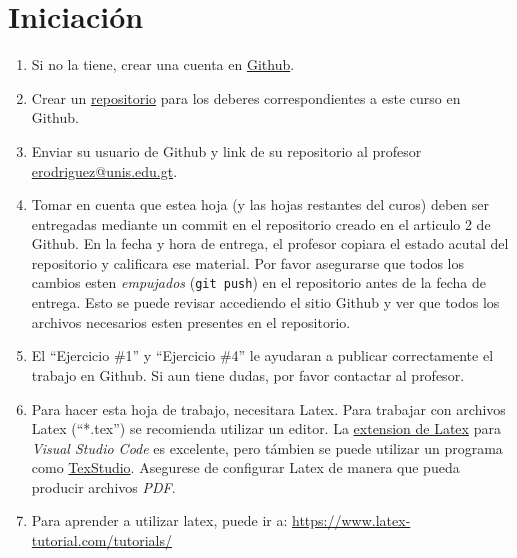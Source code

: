 \documentclass{article}
\begin{document}
\section*{Iniciaci\'on}
\begin{enumerate}
        \item{Si no la tiene, crear una cuenta en \href{https://github.com/}{Github}.}
        \item{Crear un \href{https://help.github.com/en/articles/create-a-repo}{repositorio} para los deberes correspondientes a este curso en Github.}
        \item{Enviar su usuario de Github y link de su repositorio al profesor
        \href{mailto:erodriguez@unis.edu.gt}{erodriguez@unis.edu.gt}.}
        \item{Tomar en cuenta que estea hoja
        (y las hojas restantes del curos) deben ser entregadas mediante un commit
        en el repositorio creado en el articulo 2 de Github. En la fecha y hora de entrega,
        el profesor copiara el estado acutal del repositorio y calificara ese material. Por
        favor asegurarse que todos los cambios esten \emph{empujados} (\texttt{git push}) en el
        repositorio antes de la fecha de entrega. Esto se puede revisar accediendo el sitio
        Github y ver que todos los archivos necesarios esten presentes en el repositorio.}
        \item{El ``Ejercicio \#1'' y ``Ejercicio \#4'' le ayudaran a publicar correctamente
        el trabajo en Github. Si aun tiene dudas, por favor contactar al profesor.}
        \item{Para hacer esta hoja de trabajo, necesitara Latex. Para trabajar
        con archivos Latex (``*.tex'') se recomienda utilizar un editor. La \href{https://marketplace.visualstudio.com/items?itemName=James-Yu.latex-workshop}{extension de
        Latex} para \emph{Visual Studio Code} es excelente, pero t\'ambien se puede utilizar
        un programa como \href{https://www.texstudio.org}{TexStudio}. Asegurese
        de configurar Latex de manera que pueda producir archivos \emph{PDF}.}
        \item{Para aprender a utilizar latex, puede ir a: \url{https://www.latex-tutorial.com/tutorials/}}
\end{enumerate}
\end{document}
